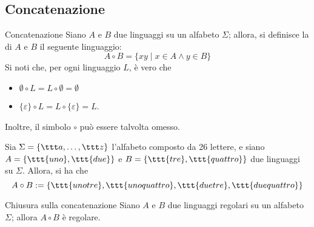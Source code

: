 \documentclass[a4paper, 12pt]{report}
\begin{document}
    \subsection{Concatenazione}

    \begin{frameddefn}{Concatenazione}
        Siano $A$ e $B$ due linguaggi su un alfabeto $\Sigma$; allora, si definisce la  di $A$ e $B$ il seguente linguaggio: $$A \circ B = \{xy \mid x \in A \land y \in B\}$$ Si noti che, per ogni linguaggio $L$, è vero che 

        \begin{itemize}
            \item $\emptyset \circ L = L \circ \emptyset = \emptyset$
            \item $\{\varepsilon \} \circ L = L \circ \{ \varepsilon \} = L$.
        \end{itemize}

        Inoltre, il simbolo $\circ$ può essere talvolta omesso.
    \end{frameddefn}

    \begin{example}[Concatenazione]
        Sia $\Sigma = \{\ttt a , \ldots, \ttt z\}$ l'alfabeto composto da 26 lettere, e siano $A = \{\ttt{uno}, \ttt{due}\}$ e $B = \{\ttt{tre}, \ttt{quattro}\}$ due linguaggi su $\Sigma$. Allora, si ha che $$A \circ B := \{\ttt{unotre}, \ttt{unoquattro}, \ttt{duetre}, \ttt{duequattro}\}$$
    \end{example}

    \begin{framedprop}[label={closure concat}]{Chiusura sulla concatenazione}
        Siano $A$ e $B$ due linguaggi regolari su un alfabeto $\Sigma$; allora $A \circ B$ è regolare.
    \end{framedprop}
\end{document}
